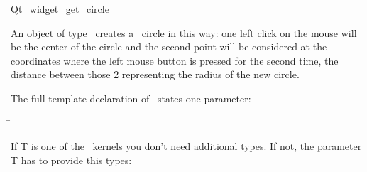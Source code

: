
\begin{ccRefClass}{Qt_widget_get_circle}

\ccDefinition
An object of type \ccRefName\ creates a \cgal\ circle in this way: one 
left click on the mouse will be the center of the circle and the
second point will be considered at the coordinates where the left
mouse button is pressed for the second time, the distance
between those 2 representing the radius of the new circle.

\ccParameters

The full template declaration of \ccClassTemplateName\ states one parameter:

\begin{tabbing}
 \=\\
\end{tabbing}

If T is one of the \cgal\ kernels you don't need additional types. If
not, the parameter T has to provide this types:

\ccTypes
{}

\ccInheritsFrom
{}

\ccGlue

\ccCreation
{}


\end{ccRefClass}









